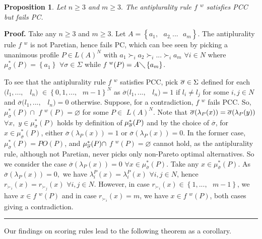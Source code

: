 \documentclass{article}
\newtheorem{proposition}[theorem]{Proposition}
\newenvironment{proof}[1][Proof]{\noindent\textbf{#1.} }{\ \rule{0.5em}{0.5em}}
\begin{document}
\begin{proposition}
Let $n\geq 3$ and $m\geq 3.$ The antiplurality rule $f$ $^{w}$ satisfies PCC
but fails PC.
\end{proposition}

\begin{proof}
Take any $n\geq 3$ and $m\geq 3.$ Let $A=\left\{ a_{1},\text{ }a_{2,}...%
\text{ }a_{m}\right\} $. The antiplurality rule $f$ $^{w}$ is not Paretian,
hence fails PC, which can bee seen by picking a unanimous profile $P\in
L(A)^{N}$ with $a_{1}\succ _{i}a_{2}\succ _{i}...\succ _{i}a_{m}$ $\forall
i\in N$ where $\mu _{\sigma }^{\ast }(P)=\left\{ a_{1}\right\} $ $\forall
\sigma \in \Sigma $ while $f$ $^{w}(P)=A\diagdown \left\{ a_{m}\right\} $.

To see that the antiplurality rule $f$ $^{w}$ satisfies PCC, pick $\overline{%
\sigma }\in \Sigma $ defined for each $(l_{1},...,$ \ $l_{n})$ $\in \left\{
0,1,...,\text{ }m-1\right\} ^{N}$ as $\overline{\sigma }(l_{1},...,$ \ $%
l_{n})=1$ if $l_{i}\neq l_{j}$ for some $i,j\in N$ and $\overline{\sigma }%
(l_{1},...,$ \ $l_{n})=0$ otherwise. Suppose, for a contradiction, $f$ $^{w}$
fails PCC. So, $\mu _{\overline{\sigma }}^{\ast }(P)\cap $ $f$ $%
^{w}(P)=\varnothing $ for some $P\in $ $L(A)^{N}$. Note that $\overline{%
\sigma }(\lambda _{P}(x))=\overline{\sigma }(\lambda _{P}(y))$ $\forall x,$ $%
y\in \mu _{\overline{\sigma }}^{\ast }(P)$ holds by definition of $\mu _{%
\overline{\sigma }}^{\ast }(P)$ and by the choice of $\overline{\sigma }$,
for $x\in \mu _{\overline{\sigma }}^{\ast }(P)$, either $\overline{\sigma }%
(\lambda _{P}(x))=1$ or $\overline{\sigma }(\lambda _{P}(x))=0$. In the
former case, $\mu _{\overline{\sigma }}^{\ast }(P)=PO(P)$, and $\mu _{%
\overline{\sigma }}^{\ast }(P)\cap $ $f$ $^{w}(P)=\varnothing $ cannot hold,
as the antiplurality rule, although not Paretian, never picks only
non-Pareto optimal alternatives. So we consider the case $\overline{\sigma }%
(\lambda _{P}(x))=0$ $\forall x\in \mu _{\overline{\sigma }}^{\ast }(P)$.
Take any $x\in \mu _{\overline{\sigma }}^{\ast }(P)$. As $\overline{\sigma }%
(\lambda _{P}(x))=0,$ we have $\lambda _{i}^{P}(x)=\lambda _{i}^{P}(x)$ $%
\forall i,j\in N$, hence $r_{\succ _{i}}(x)=r_{\succ _{j}}(x)$ $\forall
i,j\in N$. However, in case $r_{\succ _{i}}(x)\in \left\{ 1,...,\text{ }%
m-1\right\} $, we have $x\in f$ $^{w}(P)$ and in case $r_{\succ _{i}}(x)=m$,
we have $x\in f$ $^{w}(P)$, both cases giving a contradiction.
\end{proof}

Our findings on scoring rules lead to the following theorem as a corollary.
\end{document}
